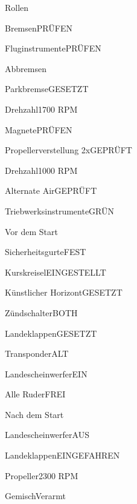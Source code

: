 \begin{task}
  \begin{checklist}{Rollen}
    \item{Bremsen}{PRÜFEN}
    \item{Fluginstrumente}{PRÜFEN}
  \end{checklist}
\end{task}

\begin{task}
  \begin{checklist}{Abbremsen}
    \item{Parkbremse}{GESETZT}
    \item{Drehzahl}{1700 RPM}
    \item{Magnete}{PRÜFEN}
    \item{Propellerverstellung 2x}{GEPRÜFT}
    \item{Drehzahl}{1000 RPM}
    \item{Alternate Air}{GEPRÜFT}
    \item{Triebwerksinstrumente}{GRÜN}
  \end{checklist}
\end{task}

\begin{task}
  \begin{checklist}{Vor dem Start}
    \item{Sicherheitsgurte}{FEST}
    \item{Kurskreisel}{EINGESTELLT}
    \item{Künstlicher Horizont}{GESETZT}
    \item{Zündschalter}{BOTH}
    \item{Landeklappen}{GESETZT}
    \item{Transponder}{ALT}
    \item{Landescheinwerfer}{EIN}
    \item{Alle Ruder}{FREI}
  \end{checklist}
\end{task}

\begin{task}
  \begin{checklist}{Nach dem Start}
    \item{Landescheinwerfer}{AUS}
    \item{Landeklappen}{EINGEFAHREN}
    \item{Propeller}{2300 RPM}
    \item{Gemisch}{Verarmt}
  \end{checklist}
\end{task}

